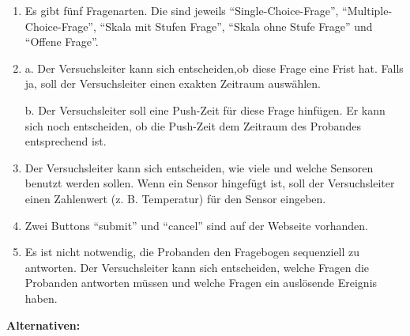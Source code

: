 \documentclass[a4paper]{scrreprt}
\begin{document}
\begin{itemize}
	            \begin{enumerate}
	            	\item Es gibt fünf Fragenarten. Die sind jeweils ``Single-Choice-Frage'', ``Multiple-Choice-Frage'', ``Skala mit Stufen Frage'', ``Skala ohne Stufe Frage'' und ``Offene Frage''.
	            	\item a. Der Versuchsleiter kann sich entscheiden,ob diese Frage eine Frist hat. Falls ja, soll der Versuchsleiter  einen exakten Zeitraum auswählen.
	            	\par b. Der Versuchsleiter soll eine Push-Zeit für diese Frage hinfügen. Er kann sich noch entscheiden, ob die Push-Zeit dem Zeitraum des Probandes entsprechend ist.
	            	\item Der Versuchsleiter kann sich entscheiden, wie viele und welche Sensoren benutzt werden sollen. Wenn ein Sensor hingefügt ist, soll der Versuchsleiter einen Zahlenwert (z. B. Temperatur) für den Sensor eingeben.
	            	\item Zwei Buttons ``submit'' und ``cancel'' sind auf der Webseite vorhanden.
                    \item Es ist nicht notwendig, die Probanden den Fragebogen sequenziell zu antworten. Der Versuchsleiter kann sich entscheiden, welche Fragen die Probanden antworten müssen und welche Fragen ein auslösende Ereignis haben.
	            \end{enumerate}
	            \par \textbf{Alternativen: }
	

\end{itemize}
\end{document}
